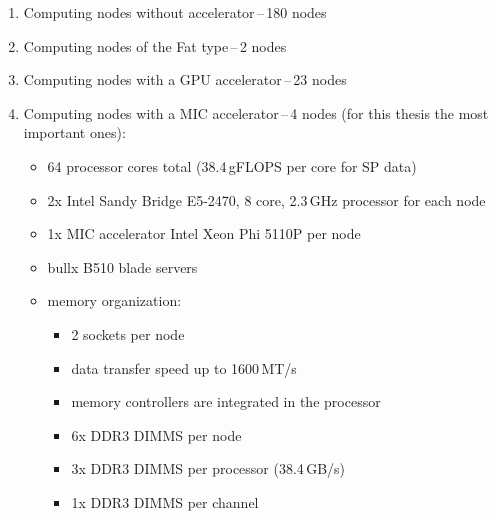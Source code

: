 \begin{enumerate}
\item{Computing nodes without accelerator\,--\,180 nodes}
\item{Computing nodes of the Fat type\,--\,2 nodes}
\item{Computing nodes with a GPU accelerator\,--\,23 nodes}
\item{Computing nodes with a MIC accelerator\,--\,4 nodes (for this thesis the most important ones):
    \begin{itemize}
    \item{64 processor cores total (38.4\,gFLOPS per core for SP data)}
    \item{2x Intel Sandy Bridge E5-2470, 8 core, 2.3\,GHz processor for each node}
    \item{1x MIC accelerator Intel Xeon Phi 5110P per node}
    \item{bullx B510 blade servers}
    \item{memory organization:
        \begin{itemize}
        \item{2 sockets per node}
        \item{data transfer speed up to 1600\,MT/s}
        \item{memory controllers are integrated in the processor}
        \item{6x DDR3 DIMMS per node}
        \item{3x DDR3 DIMMS per processor (38.4\,GB/s)}
        \item{1x DDR3 DIMMS per channel}
        \end{itemize}
    }

    \end{itemize}
}
\end{enumerate}

